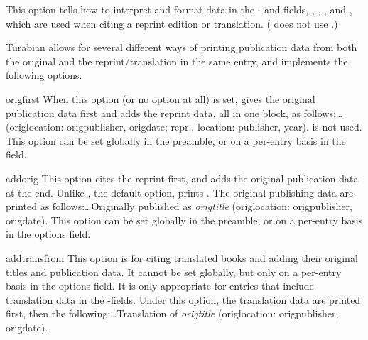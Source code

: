 \documentclass{ltxdockit}[2010/02/12]
\begin{document}
\begin{optionlist}
\label{reprintoptions}
This option tells  how to interpret and format data in the - and  fields, , , , and , which are used when citing a reprint edition or translation. ( does not use .)

Turabian allows for several different ways of printing publication data from both the original and the reprint/translation in the same entry, and  implements the following options:

\begin{valuelist}

\item[origfirst]
When this option (or no option at all) is set,  gives the original publication data first and adds the reprint data, all in one block, as follows:\ldots (origlocation: origpublisher, origdate; repr., location: publisher, year).  is not used. This option can be set globally in the preamble, or on a per-entry basis in the  field.

\item[addorig] This option cites the reprint first, and adds the original publication data at the end. Unlike , the default option,  prints . The original publishing data are printed as follows:\ldots Originally published as \emph{origtitle} (origlocation: origpublisher, origdate).  This option can be set globally in the preamble, or on a per-entry basis in the options field.


\item[addtransfrom] This option is for citing translated books and adding their original titles and publication data. It cannot be set globally, but only on a per-entry basis in the options field. It is only appropriate for  entries that include translation data in the -fields. Under this option, the translation data are printed first, then the following:\ldots Translation of \emph{origtitle} (origlocation: origpublisher, origdate). 



\end{valuelist}
\end{optionlist}
\end{document}

